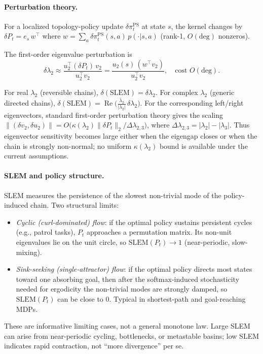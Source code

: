 \documentclass[10pt,a4paper]{article}
\begin{document}
\paragraph{Perturbation theory.}
For a localized topology-policy update $\delta\pi^{\mathrm{PS}}_t$ at state $s$, the kernel changes by
$\delta P_t = e_s\,w^\top$ where $w = \sum_a \delta\pi^{\mathrm{PS}}_t(s,a)\,p(\cdot|s,a)$ (rank-1,
$O(\mathrm{deg})$ nonzeros).

The first-order eigenvalue perturbation is
\[
  \delta\lambda_2 \approx \frac{u_2^\top(\delta P_t)\,v_2}{u_2^\top v_2}
  = \frac{u_2(s)\,(w^\top v_2)}{u_2^\top v_2}, \quad\text{cost } O(\mathrm{deg}).
\]

For real $\lambda_2$ (reversible chains), $\delta(\mathrm{SLEM}) = \delta\lambda_2$.
For complex $\lambda_2$ (generic directed chains),
$\delta(\mathrm{SLEM}) = \operatorname{Re}\!\bigl(\tfrac{\bar\lambda_2}{|\lambda_2|}\,\delta\lambda_2\bigr)$.
For the corresponding left/right eigenvectors, standard first-order perturbation theory gives the scaling
$\|(\delta v_2, \delta u_2)\| = O\!\bigl(\kappa(\lambda_2)\|\delta P_t\|_2 / \Delta\lambda_{2,3}\bigr)$,
where $\Delta\lambda_{2,3} = |\lambda_2| - |\lambda_3|$.
Thus eigenvector sensitivity becomes large either when the eigengap closes or when the chain is strongly non-normal; no uniform $\kappa(\lambda_2)$ bound is available under the current assumptions.


\paragraph{SLEM and policy structure.}
SLEM measures the persistence of the slowest non-trivial mode of the policy-induced chain.
Two structural limits:
\begin{itemize}\setlength\itemsep{0pt}
  \item \textit{Cyclic (curl-dominated) flow}: if the optimal policy sustains persistent cycles (e.g., patrol tasks), $P_t$ approaches a permutation matrix. Its non-unit eigenvalues lie on the unit circle, so $\mathrm{SLEM}(P_t)\to 1$ (near-periodic, slow-mixing).
  \item \textit{Sink-seeking (single-attractor) flow}: if the optimal policy directs most states toward one absorbing goal, then after the softmax-induced stochasticity needed for ergodicity the non-trivial modes are strongly damped, so $\mathrm{SLEM}(P_t)$ can be close to $0$. Typical in shortest-path and goal-reaching MDPs.
\end{itemize}
These are informative limiting cases, not a general monotone law. Large SLEM can arise from
near-periodic cycling, bottlenecks, or metastable basins; low SLEM indicates rapid contraction,
not ``more divergence'' per se.
\end{document}
